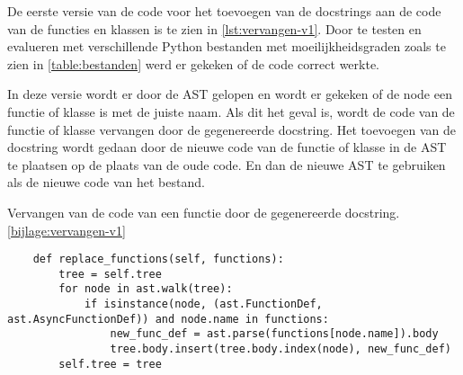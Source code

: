 De eerste versie van de code voor het toevoegen van de docstrings aan de code van de functies en klassen is te zien in \ref{lst:vervangen-v1}.
Door te testen en evalueren met verschillende Python bestanden met moeilijkheidsgraden zoals te zien in \ref{table:bestanden} werd er gekeken of de code correct werkte.

\begin{table}[h!]
    \centering
    \caption{Aantal functies en klassen in de verschillende Python bestanden.}
    \label{table:bestanden}
\end{table}

In deze versie wordt er door de AST gelopen en wordt er gekeken of de node een functie of klasse is met de juiste naam. 
Als dit het geval is, wordt de code van de functie of klasse vervangen door de gegenereerde docstring.
Het toevoegen van de docstring wordt gedaan door de nieuwe code van de functie of klasse in de AST te plaatsen op de plaats van de oude code.
En dan de nieuwe AST te gebruiken als de nieuwe code van het bestand.

\begin{listing}
    \caption[Code voor het vervangen van een docstring]{Vervangen van de code van een functie door de gegenereerde docstring. \ref{bijlage:vervangen-v1}}
    \label{lst:vervangen-v1}
    \begin{verbatim}
    def replace_functions(self, functions):
        tree = self.tree
        for node in ast.walk(tree):
            if isinstance(node, (ast.FunctionDef, ast.AsyncFunctionDef)) and node.name in functions:
                new_func_def = ast.parse(functions[node.name]).body
                tree.body.insert(tree.body.index(node), new_func_def)        
        self.tree = tree

    \end{verbatim}
\end{listing}


